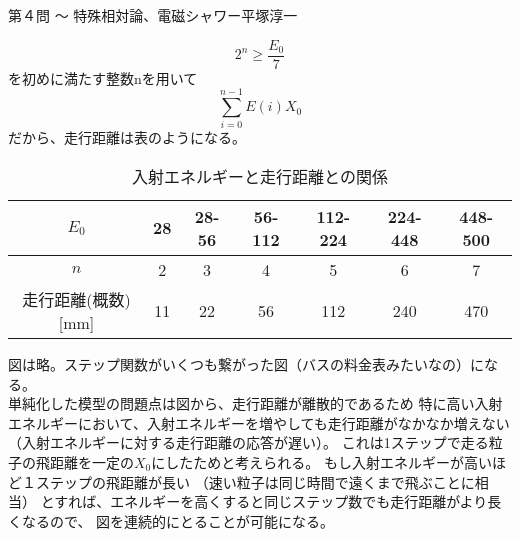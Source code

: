 \begin{answer}{第４問 〜 特殊相対論、電磁シャワー}{平塚淳一}
\begin{enumerate}
\begin{enumerate}
    \begin{equation}
    2^n \ge \frac{E_0}{7}
    \end{equation}
    を初めに満たす整数nを用いて
    \begin{equation}
    \sum^{n-1}_{i=0}E(i)X_0
    \end{equation}
    だから、走行距離は表のようになる。
    \begin{table}
      \begin{center}
        \caption{入射エネルギーと走行距離との関係}
        \begin{tabular}{ccccccc}
          \hline
           $E_0$ & 28 & 28-56 & 56-112 & 112-224 & 224-448 & 448-500 \\
          \hline
           $n$ & 2 & 3 & 4 & 5 & 6 & 7 \\
          \hline
           走行距離(概数)[mm] & 11 & 22 & 56 & 112 & 240 & 470 \\
          \hline
        \end{tabular}
      \end{center}
    \end{table}
    図は略。ステップ関数がいくつも繋がった図（バスの料金表みたいなの）になる。\\
    単純化した模型の問題点は図から、走行距離が離散的であるため
    特に高い入射エネルギーにおいて、入射エネルギーを増やしても走行距離がなかなか増えない
    （入射エネルギーに対する走行距離の応答が遅い）。
    これは1ステップで走る粒子の飛距離を一定の$X_0$にしたためと考えられる。
    もし入射エネルギーが高いほど１ステップの飛距離が長い
    （速い粒子は同じ時間で遠くまで飛ぶことに相当）
    とすれば、エネルギーを高くすると同じステップ数でも走行距離がより長くなるので、
    図を連続的にとることが可能になる。
  \end{enumerate}
\end{enumerate}
\end{answer}

